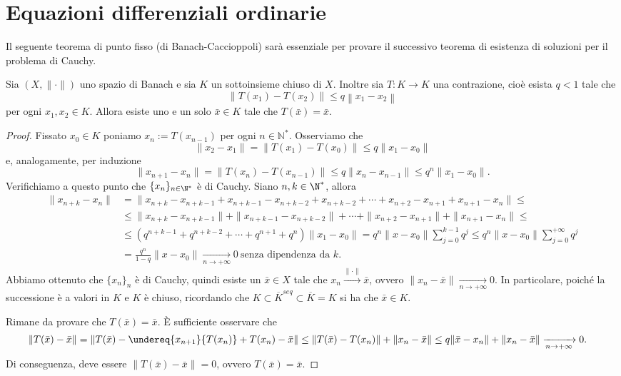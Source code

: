 \section{Equazioni differenziali ordinarie}
Il seguente teorema di punto fisso (di Banach-Caccioppoli) sarà essenziale per provare il successivo teorema di esistenza di soluzioni per il problema di Cauchy.
\begin{shadedTheorem}\label{thm: 5.1 Banach Caccioppoli}
    Sia $(X,\|\cdot\|)$ uno spazio di Banach e sia $K$ un sottoinsieme chiuso di $X$. Inoltre sia $T: K \rightarrow K$ una contrazione, cioè esista $q<1$ tale che
   \[\left\|T\left(x_{1}\right)-T\left(x_{2}\right)\right\| \leq q\left\|x_{1}-x_{2}\right\|\]
   per ogni $x_{1}, x_{2} \in K$. Allora esiste uno e un solo $\bar{x} \in K$ tale che $T(\bar{x})=\bar{x}$.
\end{shadedTheorem}
\begin{proof}
    Fissato $x_0\in K$ poniamo $x_n:=T(x_{n-1})$ per ogni $n\in\mathbb{N}^*$. Osserviamo che 
    \[\|x_2-x_1\| = \|T(x_1)-T(x_0)\|\leq q \|x_1-x_0\|\]
    e, analogamente, per induzione 
    \[\|x_{n+1}-x_n\| = \|T(x_n)-T(x_{n-1})\|\leq q \|x_n-x_{n-1}\|\leq q^n\|x_1-x_0\|.\]
    Verifichiamo a questo punto che $\{x_n\}_{n\in\N^*}$ è di Cauchy. Siano $n,k\in\N^*$, allora
    \begin{align*}
        \|x_{n+k}-x_n\| &= \|x_{n+k}-x_{n+k-1}+x_{n+k-1}-x_{n+k-2}+x_{n+k-2}+\cdots+ x_{n+2}-x_{n+1}+x_{n+1}-x_n\|\leq\\
        & \leq \|x_{n+k}-x_{n+k-1}\|+\|x_{n+k-1}-x_{n+k-2}\|+\cdots+\|x_{n+2}-x_{n+1}\|+\|x_{n+1}-x_n\|\leq \\
        & \leq \left( q^{n+k-1}+q^{n+k-2} +\cdots + q^{n+1}+q^n\right)\|x_1-x_0\| = q^n \|x-x_0\|\sum_{j=0}^{k-1}q^j \leq q^n \|x-x_0\|\sum_{j=0}^{+\infty}q^j \\
        & = \frac{q^n}{1-q}\|x-x_0\|\xrightarrow[n\to +\infty]{}0\ \text{senza dipendenza da }k.
    \end{align*}
    Abbiamo ottenuto che $\{x_n\}_n$ è di Cauchy, quindi esiste un $\bar x \in X$ tale che $x_n\xrightarrow{\|\cdot\|}\bar x$, ovvero $\|x_n-\bar x\|\xrightarrow[n\to +\infty]{
    }0$. In particolare, poiché la successione è a valori in $K$ e $K$ è chiuso, ricordando che $K\subset \overline{K}^{seq}\subset \overline{K} =K$ si ha che $\bar x \in K$.

    Rimane da provare che $T(\bar x) = \bar x$. È sufficiente osservare che 
    \begin{align*}
        \|T(\bar x)-\bar x\| &= \|T(\bar x)-\undereq{x_{n+1}}{T(x_n)}+T(x_n)-\bar{x}\| \leq  \|T(\bar x)-T(x_n)\|+\|x_n-\bar x\|\leq q \|\bar x-x_n\| + \|x_n-\bar x\|\xrightarrow[n\to +\infty]{}0.
    \end{align*}
    Di conseguenza, deve essere $\|T(\bar x)-\bar x\| = 0$, ovvero $T(\bar x) = \bar x$.
\end{proof}

